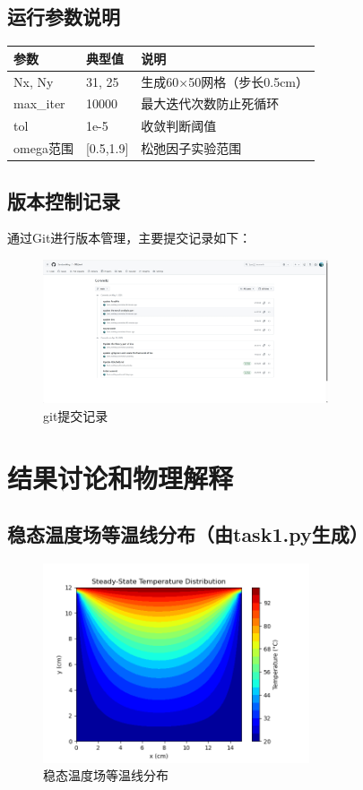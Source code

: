 \documentclass[UTF8]{ctexart}
\begin{document}
\subsection{运行参数说明}
\begin{tabular}{|>{\ttfamily}l|l|p{8cm}|}
    \hline
    \rmfamily 参数 & 典型值 & 说明 \\
    \hline
    Nx, Ny & 31, 25 & 生成60×50网格（步长0.5cm） \\
    max\_iter & 10000 & 最大迭代次数防止死循环 \\
    tol & 1e-5 & 收敛判断阈值 \\
    omega范围 & [0.5,1.9] & 松弛因子实验范围 \\
    \hline
\end{tabular}

\subsection{版本控制记录}
通过Git进行版本管理，主要提交记录如下：
\begin{figure}[h]
    \centering
    \includegraphics[width=0.75\textwidth]{c1.png}
    \caption{git提交记录}
    \label{fig:commit}
\end{figure}

\newpage
\section{结果讨论和物理解释}

\subsection{稳态温度场等温线分布（由task1.py生成）}
\begin{figure}[h]
    \centering
    \includegraphics[width=0.7\textwidth]{Figure_1.png}
    \caption{稳态温度场等温线分布}
    \label{fig:contour}
\end{figure}
\end{document}
